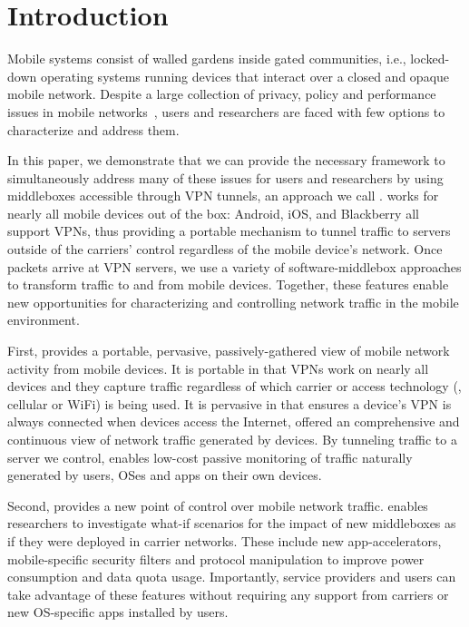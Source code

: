 \section{Introduction}
\label{sec:introduction}

Mobile systems consist of walled gardens inside gated 
communities, i.e., locked-down operating systems running 
devices that interact over a closed and opaque mobile network. 
Despite a large collection of privacy, policy and performance issues
in mobile networks~\cite{enck:taintdroid,hornyack:appfence,speedtest,eprof},
users and researchers are faced with few options to  
characterize and address them.

In this paper, we demonstrate that we can provide the necessary framework to
simultaneously address many of these issues for users and researchers by using
middleboxes accessible through VPN tunnels, an approach we call
\meddle.  \meddle works for nearly all mobile devices out of the box:
Android, iOS, and Blackberry all support VPNs, thus providing a
portable mechanism to tunnel traffic to servers outside of the
carriers' control regardless of the mobile device's network.  Once
packets arrive at VPN servers, we use a variety of software-middlebox
approaches to transform traffic to and from mobile devices. Together, 
these features enable new opportunities for characterizing and 
controlling network traffic in the mobile environment.

First, \meddle provides a portable, pervasive, passively-gathered view of mobile network activity 
from mobile devices. It is portable in that VPNs work on nearly all 
devices and they capture traffic regardless of which carrier or access technology (\eg, 
cellular or WiFi) is being used. It is pervasive in that \meddle ensures a 
device's VPN is always connected when devices access the Internet, offered 
an comprehensive and continuous view of network traffic generated by devices. By tunneling traffic to a server we control, \meddle enables low-cost passive monitoring 
of traffic naturally generated by users, OSes and apps on their own devices.

Second, \meddle provides a new point of control over mobile 
network traffic. \meddle 
enables researchers to investigate what-if scenarios for the 
impact of new middleboxes as if they were deployed in carrier 
networks. These include new app-accelerators, 
mobile-specific security filters and protocol manipulation 
to improve power consumption and data quota usage. Importantly, 
service providers and users can take advantage of these features 
without requiring any support from carriers or new OS-specific 
apps installed by users.

